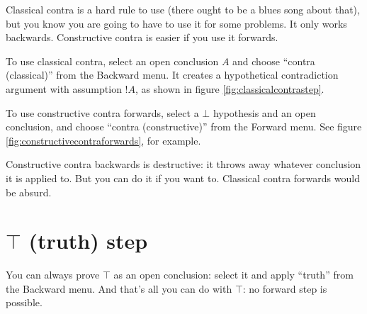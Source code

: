 \documentclass[11pt]{book}
\newcommand{\figref}[1]{figure \ref{fig:#1}}
\begin{document}
Classical contra is a hard rule to use (there ought to be a blues song about that), but you know you are going to have to use it for some problems. It only works backwards. Constructive contra is easier if you use it forwards.

To use classical contra, select an open conclusion $A$ and choose ``contra (classical)'' from the Backward menu. It creates a hypothetical contradiction argument with assumption $!A$, as shown in \figref{classicalcontrastep}.

To use constructive contra forwards, select a $\bot$ hypothesis and an open conclusion, and choose ``contra (constructive)'' from the Forward menu. See \figref{constructivecontraforwards}, for example.

Constructive contra backwards is destructive: it throws away whatever conclusion it is applied to. But you can do it if you want to. Classical contra forwards would be absurd.

\section{$\top$ (truth) step}

You can always prove $\top$ as an open conclusion: select it and apply ``truth'' from the Backward menu. And that's all you can do with $\top$: no forward step is possible.
\end{document}
